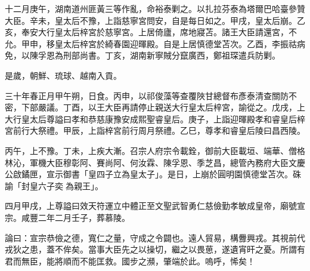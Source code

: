 \begin{pinyinscope}
十二月庚午，湖南道州匪黃三等作亂，命裕泰剿之。以扎拉芬泰為塔爾巴哈臺參贊大臣。辛未，皇太后不豫，上詣慈寧宮問安，自是每日如之。甲戌，皇太后崩。乙亥，奉安大行皇太后梓宮於慈寧宮。上居倚廬，席地寢苫。諸王大臣請還宮，不允。甲申，移皇太后梓宮於綺春園迎暉殿。自是上居慎德堂苫次。乙酉，李振祜病免，以陳孚恩為刑部尚書。丁亥，湖南新寧賊分竄廣西，鄭祖琛遣兵防剿。

是歲，朝鮮、琉球、越南入貢。

三十年春正月甲午朔，日食。丙申，以祁俊藻等查覆陜甘總督布彥泰清查關防不密，下部嚴議。丁酉，以王大臣再請停止親送大行皇太后梓宮，諭從之。戊戌，上大行皇太后尊謚曰孝和恭慈康豫安成熙聖睿皇后。庚子，上詣迎暉殿孝和睿皇后梓宮前行大祭禮。甲辰，上詣梓宮前行周月祭禮。乙巳，尊孝和睿皇后陵曰昌西陵。

丙午，上不豫。丁未，上疾大漸。召宗人府宗令載銓，御前大臣載垣、端華、僧格林沁，軍機大臣穆彰阿、賽尚阿、何汝霖、陳孚恩、季芝昌，總管內務府大臣文慶公啟鐍匣，宣示御書「皇四子立為皇太子」。是日，上崩於圓明園慎德堂苫次。硃諭「封皇六子奕為親王」。

四月甲戌，上尊謚曰效天符運立中體正至文聖武智勇仁慈儉勤孝敏成皇帝，廟號宣宗。咸豐二年二月壬子，葬慕陵。

論曰：宣宗恭儉之德，寬仁之量，守成之令闢也。遠人貿易，構釁興戎。其視前代戎狄之患，蓋不侔矣。當事大臣先之以操切，繼之以畏葸，遂遺宵旰之憂。所謂有君而無臣，能將順而不能匡救。國步之瀕，肇端於此。嗚呼，悕矣！


\end{pinyinscope}